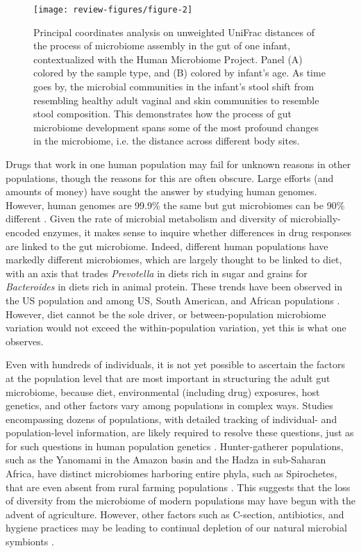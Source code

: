 \begin{figure}[htbp]
\texttt{[image: review-figures/figure-2]}
\label{review_fig2}
\caption[Principal coordinates analysis on unweighted UniFrac distances of the process of microbiome assembly in the gut of one infant, contextualized with the Human Microbiome Project.]{Principal coordinates analysis on unweighted UniFrac distances of the process of microbiome assembly in the gut of one infant, contextualized with the Human Microbiome Project. Panel (A) colored by the sample type, and (B) colored by infant's age. As time goes by, the microbial communities in the infant's stool shift from resembling healthy adult vaginal and skin communities to resemble stool composition. This demonstrates how the process of gut microbiome development spans some of the most profound changes in the microbiome, i.e. the distance across different body sites.}
\end{figure}

Drugs that work in one human population may fail for unknown reasons in other populations, though the reasons for this are often obscure. Large efforts (and amounts of money) have sought the answer by studying human genomes. However, human genomes are 99.9\% the same but gut microbiomes can be 90\% different \cite{RN4081}. Given the rate of microbial metabolism and diversity of microbially-encoded enzymes, it makes sense to inquire whether  differences in drug responses are linked to the gut microbiome. Indeed, different human populations have markedly different microbiomes, which are largely thought to be linked to diet, with an axis that trades \textit{Prevotella} in diets rich in sugar and grains for \textit{Bacteroides} in diets rich in animal protein. These trends have been observed in the US population \cite{RN4088} and among US, South American, and African populations \cite{RN4061}. However, diet cannot be the sole driver, or between-population microbiome variation would not exceed the within-population variation, yet this is what one observes.

Even with hundreds of individuals, it is not yet possible to ascertain the factors at the population level that are most important in structuring the adult gut microbiome, because diet, environmental (including drug) exposures, host genetics, and other factors vary among populations in complex ways. Studies encompassing dozens of populations, with detailed tracking of individual- and population-level information, are likely required to resolve these questions, just as for such questions in human population genetics \cite{RN4078}. Hunter-gatherer populations, such as the Yanomami in the Amazon basin and the Hadza in sub-Saharan Africa, have distinct microbiomes harboring entire phyla, such as Spirochetes, that are even absent from rural farming populations \cite{RN4111, RN4113, RN4112}. This suggests that the loss of diversity from the microbiome of modern populations may have begun with the advent of agriculture. However, other factors such as C-section, antibiotics, and hygiene practices may be leading to continual depletion of our natural microbial symbionts \cite{RN4079}.

